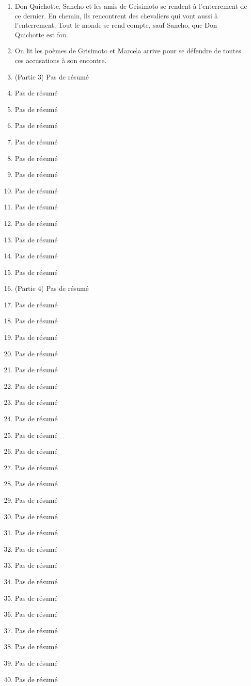\documentclass{article}
\begin{document}
\begin{enumerate}
    \item Don Quichotte, Sancho et les amis de Grisimoto se rendent à l'enterrement de ce dernier. En chemin, ils rencontrent des chevaliers qui vont aussi à l'enterrement. Tout le monde se rend compte, sauf Sancho, que Don Quichotte est fou.
    \item On lit les poèmes de Grisimoto et Marcela arrive pour se défendre de toutes ces accusations à son encontre.
    \item (Partie 3) Pas de résumé
    \item Pas de résumé
    \item Pas de résumé
    \item Pas de résumé
    \item Pas de résumé
    \item Pas de résumé
    \item Pas de résumé
    \item Pas de résumé
    \item Pas de résumé
    \item Pas de résumé
    \item Pas de résumé
    \item Pas de résumé
    \item Pas de résumé
    \item (Partie 4) Pas de résumé
    \item Pas de résumé
    \item Pas de résumé
    \item Pas de résumé
    \item Pas de résumé
    \item Pas de résumé
    \item Pas de résumé
    \item Pas de résumé
    \item Pas de résumé
    \item Pas de résumé
    \item Pas de résumé
    \item Pas de résumé
    \item Pas de résumé
    \item Pas de résumé
    \item Pas de résumé
    \item Pas de résumé
    \item Pas de résumé
    \item Pas de résumé
    \item Pas de résumé
    \item Pas de résumé
    \item Pas de résumé
    \item Pas de résumé
    \item Pas de résumé
    \item Pas de résumé
    \item Pas de résumé
\end{enumerate}
\end{document}

